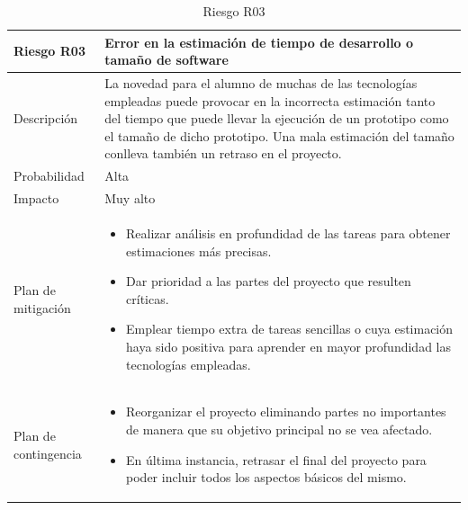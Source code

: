 \begin{table}[H]
	\centering
	\footnotesize
	\begin{tabularx}{\textwidth}{|l|X|}
		\hline
		\rowcolor[HTML]{C0C0C0} 
		\textbf{Riesgo R03}  & \textbf{Error en la estimación de tiempo de desarrollo o tamaño de software} \\ \hline
		Descripción          & La novedad para el alumno de muchas de las tecnologías empleadas puede provocar en la incorrecta estimación tanto del tiempo que puede llevar la ejecución de un prototipo como el tamaño de dicho prototipo. Una mala estimación del tamaño conlleva también un retraso en el proyecto. \\ \hline
		Probabilidad         & Alta \\ \hline
		Impacto              & Muy alto \\ \hline
		Plan de mitigación   & \begin{minipage}[t]{\linewidth}
			\begin{itemize}[leftmargin=*, noitemsep]
				\item Realizar análisis en profundidad de las tareas para obtener estimaciones más precisas.
				\item Dar prioridad a las partes del proyecto que resulten críticas.
				\item Emplear tiempo extra de tareas sencillas o cuya estimación haya sido positiva para aprender en mayor profundidad las tecnologías empleadas.
			\end{itemize}
		\end{minipage} \\ \hline
		Plan de contingencia & \begin{minipage}[t]{\linewidth}
			\begin{itemize}[leftmargin=*, noitemsep]
				\item Reorganizar el proyecto eliminando partes no importantes de manera que su objetivo principal no se vea afectado.
				\item En última instancia, retrasar el final del proyecto para poder incluir todos los aspectos básicos del mismo.
			\end{itemize}
		\end{minipage} \\ \hline
	\end{tabularx}
	\caption{Riesgo R03}
	\label{tab:riesgo_3}
\end{table}

